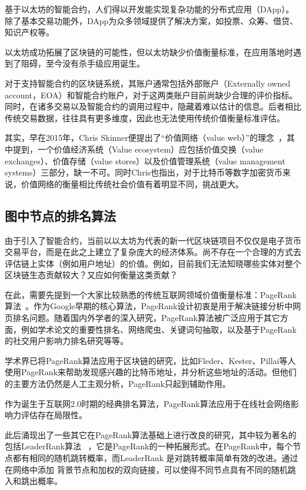 基于以太坊的智能合约，人们得以开发能实现复杂功能的分布式应用（DApp）。除了基本交易功能外，DApp为众多领域提供了解决方案，如投票、众筹、借贷、知识产权等。

以太坊成功拓展了区块链的可能性，但以太坊缺少价值衡量标准，在应用落地时遇到了阻碍，至今没有杀手级应用诞生。

对于支持智能合约的区块链系统，其账户通常包括外部账户（Externally owned account，EOA）和智能合约账户，对于这两类账户目前尚缺少合理的评价指标。同时，在诸多交易以及智能合约的调用过程中，隐藏着难以估计的信息。后者相比传统交易数据，往往具有更多维度，因此也无法使用传统价值衡量标准评估。

其实，早在2015年，Chris Skinner便提出了“价值网络（value web）”的理念~\cite{ChrisSkinner}，其中提到，一个价值经济系统（Value ecosystem）应包括价值交换（value exchanges）、价值存储（value stores）以及价值管理系统（value management systems）三部分，缺一不可。同时Chris也指出，对于比特币等数字加密货币来说，价值网络的衡量相比传统社会价值有着明显不同，挑战更大。






\subsection{图中节点的排名算法}

由于引入了智能合约，当前以以太坊为代表的新一代区块链项目不仅仅是电子货币交易平台，而是在此之上建立了复杂庞大的经济体系。尚不存在一个合理的方式去评估链上实体（例如用户地址）的价值。例如，目前我们无法知晓哪些实体对整个区块链生态贡献较大？又应如何衡量这类贡献？

在此，需要先提到一个大家比较熟悉的传统互联网领域价值衡量标准：PageRank算法~\cite{page1999pagerank}。作为Google早期的核心算法，PageRank设计初衷是用于解决链接分析中网页排名问题。随着国内外学者的深入研究，PageRank算法被广泛应用于其它方面，例如学术论文的重要性排名、网络爬虫、关键词句抽取，以及基于PageRank的社交用户影响力排名研究等等。

学术界已将PageRank算法应用于区块链的研究，比如Fleder、Kester、Pillai等人~\cite{Fleder2015} 使用PageRank来帮助发现感兴趣的比特币地址，并分析这些地址的活动。但他们的主要方法仍然是人工主观分析，PageRank只起到辅助作用。

作为诞生于互联网2.0时期的经典排名算法，PageRank算法应用于在线社会网络影响力评估存在局限性。

此后涌现出了一些其它在PageRank算法基础上进行改良的研究，其中较为著名的包括LeaderRank算法 ~\cite{Li2014}，它是PageRank的一种拓展形式。在PageRank中，每个节点都有相同的随机跳转概率，而LeaderRank 是对跳转概率简单有效的改进。通过在网络中添加 背景节点和加权的双向链接，可以使得不同节点具有不同的随机跳入和跳出概率。


